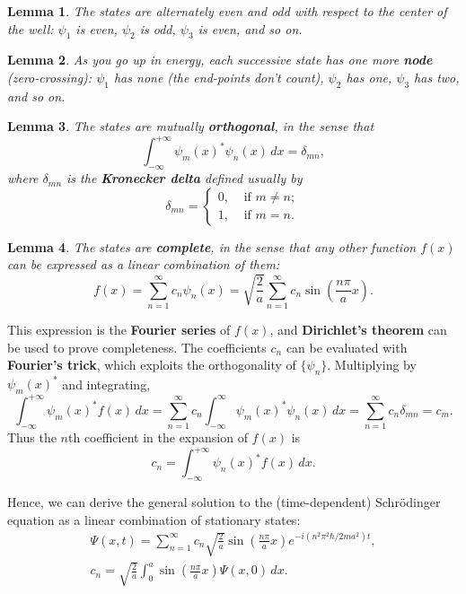 \documentclass{article}
\newtheorem{lemma}{Lemma}
\begin{document}
\begin{lemma}
  The states are alternately \emph{even} and \emph{odd} with respect to the
  center of the well: $\psi_1$ is even, $\psi_2$ is odd, $\psi_3$ is even, and
  so on.
\end{lemma}

\begin{lemma}
  As you go up in energy, each successive state has one more \textbf{node}
  (zero-crossing): $\psi_1$ has none (the end-points don't count), $\psi_2$ has
  one, $\psi_3$ has two, and so on.
\end{lemma}

\begin{lemma}
  The states are mutually \textbf{orthogonal}, in the sense that \[
    \int_{-\infty}^{+\infty} \psi_m(x)^* \psi_n(x) \,dx = \delta_{mn},
  \] where $\delta_{mn}$ is the \textbf{Kronecker delta} defined usually by \[
    \delta_{mn} =
    \begin{cases}
      0, &\text{ if } m \neq n; \\
      1, &\text{ if } m = n.
    \end{cases}
  \]
\end{lemma}

\begin{lemma}
  The states are \textbf{complete}, in the sense that any \emph{other} function
  $f(x)$ can be expressed as a linear combination of them: \[
    f(x)
    = \sum_{n = 1}^{\infty} c_n\psi_n(x)
    = \sqrt{\frac{2}{a}} \sum_{n = 1}^{\infty}
      c_n\sin\left(\frac{n\pi}{a}x\right).
  \]
\end{lemma}
This expression is the \textbf{Fourier series} of $f(x)$, and
\textbf{Dirichlet's theorem} can be used to prove completeness. The
coefficients $c_n$ can be evaluated with \textbf{Fourier's trick}, which
exploits the orthogonality of $\{\psi_n\}$. Multiplying by $\psi_m(x)^*$ and
integrating, \[
  \int_{-\infty}^{+\infty} \psi_m(x)^* f(x) \,dx
  = \sum_{n = 1}^{\infty} c_n \int_{-\infty}^{\infty}
    \psi_m(x)^* \psi_n(x)
  \,dx
  = \sum_{n = 1}^{\infty} c_n\delta_{mn}
  = c_m.
\] Thus the $n$th coefficient in the expansion of $f(x)$ is
\begin{equation} \label{eq:sim-har-osc-Psi-coeff}
  \boxed{
    c_n = \int_{-\infty}^{+\infty} \psi_n(x)^* f(x) \,dx.
  }
\end{equation}

Hence, we can derive the general solution to the (time-dependent)
Schr\"{o}dinger equation as a linear combination of stationary states:
\begin{equation} \label{eq:sim-har-osc-Psi}
  \boxed{
    \begin{gathered}
      \Psi(x, t) = \sum_{n = 1}^{\infty}
        c_n\sqrt{\frac{2}{a}} \sin\left(\frac{n\pi}{a}x\right)
        e^{-i(n^2\pi^2\hbar/2ma^2)t}, \\
      c_n = \sqrt{\frac{2}{a}} \int_0^a
        \sin\left(\frac{n\pi}{a}x\right) \Psi(x, 0)
      \,dx.
    \end{gathered}
  }
\end{equation}
\end{document}
